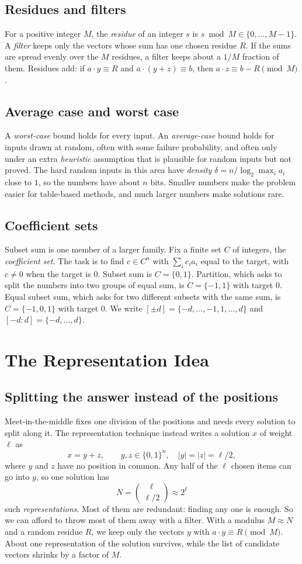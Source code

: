 \documentclass[conference]{IEEEtran}
\begin{document}
\subsection{Residues and filters}
For a positive integer $M$, the \emph{residue} of an integer $s$ is
$s\bmod M\in\{0,\dots,M-1\}$. A \emph{filter} keeps only the vectors whose sum has
one chosen residue $R$. If the sums are spread evenly over the $M$ residues, a
filter keeps about a $1/M$ fraction of them. Residues add: if
$a\cdot y\equiv R$ and $a\cdot(y+z)\equiv b$, then $a\cdot z\equiv b-R\pmod M$.

\subsection{Average case and worst case}
A \emph{worst-case} bound holds for every input. An \emph{average-case} bound
holds for inputs drawn at random, often with some failure probability, and
often only under an extra \emph{heuristic} assumption that is plausible for
random inputs but not proved. The hard random inputs in this area have
\emph{density} $\delta=n/\log_2\max_ia_i$ close to $1$, so the numbers have
about $n$ bits. Smaller numbers make the problem easier for table-based
methods, and much larger numbers make solutions rare.

\subsection{Coefficient sets}
Subset sum is one member of a larger family. Fix a finite set $C$ of integers,
the \emph{coefficient set}. The task is to find $c\in C^n$ with
$\sum_ic_ia_i$ equal to the target, with $c\neq0$ when the target is $0$. Subset
sum is $C=\{0,1\}$. Partition, which asks to split the numbers into two groups
of equal sum, is $C=\{-1,1\}$ with target $0$. Equal subset sum, which asks for
two different subsets with the same sum, is $C=\{-1,0,1\}$ with target $0$. We
write $[\pm d]=\{-d,\dots,-1,1,\dots,d\}$ and $[-d:d]=\{-d,\dots,d\}$.

\section{The Representation Idea}\label{sec:idea}

\subsection{Splitting the answer instead of the positions}
Meet-in-the-middle fixes one division of the positions and needs every solution
to split along it. The representation technique instead writes a solution $x$
of weight $\ell$ as
\[
x=y+z,\qquad y,z\in\{0,1\}^n,\quad |y|=|z|=\ell/2,
\]
where $y$ and $z$ have no position in common. Any half of the $\ell$ chosen
items can go into $y$, so one solution has
\[
N=\binom{\ell}{\ell/2}\approx2^{\ell}
\]
such \emph{representations}. Most of them are redundant: finding any one is
enough. So we can afford to throw most of them away with a filter. With a
modulus $M\approx N$ and a random residue $R$, we keep only the vectors $y$ with
$a\cdot y\equiv R\pmod M$. About one representation of the solution survives,
while the list of candidate vectors shrinks by a factor of $M$.
\end{document}

